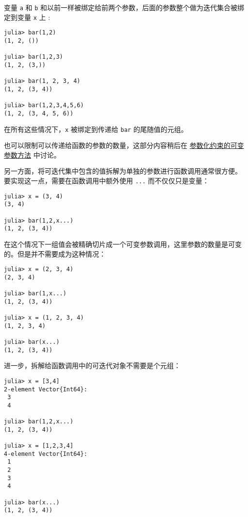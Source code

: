 变量 \texttt{a} 和 \texttt{b} 和以前一样被绑定给前两个参数，后面的参数整个做为迭代集合被绑定到变量 \texttt{x} 上 :




\begin{verbatim}
julia> bar(1,2)
(1, 2, ())

julia> bar(1,2,3)
(1, 2, (3,))

julia> bar(1, 2, 3, 4)
(1, 2, (3, 4))

julia> bar(1,2,3,4,5,6)
(1, 2, (3, 4, 5, 6))
\end{verbatim}



在所有这些情况下，\texttt{x} 被绑定到传递给 \texttt{bar} 的尾随值的元组。



也可以限制可以传递给函数的参数的数量，这部分内容稍后在  \hyperlink{14394864568540094383}{参数化约束的可变参数方法}  中讨论。



另一方面，将可迭代集中包含的值拆解为单独的参数进行函数调用通常很方便。 要实现这一点，需要在函数调用中额外使用 \texttt{...} 而不仅仅只是变量：




\begin{verbatim}
julia> x = (3, 4)
(3, 4)

julia> bar(1,2,x...)
(1, 2, (3, 4))
\end{verbatim}



在这个情况下一组值会被精确切片成一个可变参数调用，这里参数的数量是可变的。但是并不需要成为这种情况：




\begin{verbatim}
julia> x = (2, 3, 4)
(2, 3, 4)

julia> bar(1,x...)
(1, 2, (3, 4))

julia> x = (1, 2, 3, 4)
(1, 2, 3, 4)

julia> bar(x...)
(1, 2, (3, 4))
\end{verbatim}



进一步，拆解给函数调用中的可迭代对象不需要是个元组：




\begin{verbatim}
julia> x = [3,4]
2-element Vector{Int64}:
 3
 4

julia> bar(1,2,x...)
(1, 2, (3, 4))

julia> x = [1,2,3,4]
4-element Vector{Int64}:
 1
 2
 3
 4

julia> bar(x...)
(1, 2, (3, 4))
\end{verbatim}



